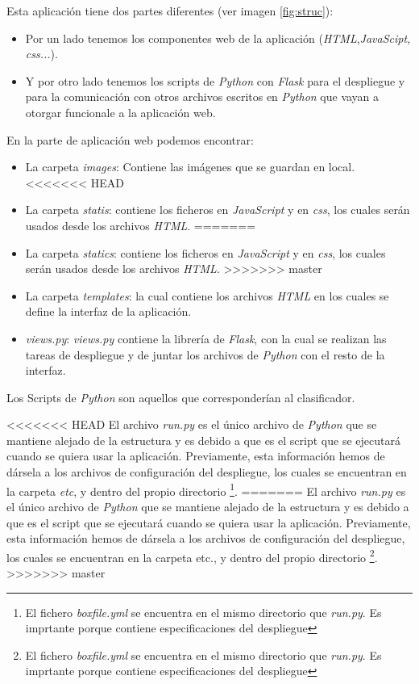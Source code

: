 Esta aplicación tiene dos partes diferentes (ver imagen \ref{fig:struc}):

\begin{itemize}
	\item Por un lado tenemos los componentes web de la aplicación (\textit{HTML},\textit{JavaScipt, css...}).
	\item Y por otro lado tenemos los scripts de \textit{Python} con \textit{Flask} para el despliegue y para la comunicación con otros archivos escritos en \textit{Python} que vayan a otorgar funcionale a la aplicación web.
\end{itemize}

En la parte de aplicación web podemos encontrar:
\begin{itemize}
	\item La carpeta \textit{images}: Contiene las imágenes que se guardan en local.
<<<<<<< HEAD
	\item La carpeta \textit{statis}: contiene los ficheros en \textit{JavaScript} y en \textit{css}, los cuales serán usados desde los archivos \textit{HTML}.
=======
	\item La carpeta \textit{statics}: contiene los ficheros en \textit{JavaScript} y en \textit{css}, los cuales serán usados desde los archivos \textit{HTML}.
>>>>>>> master
	\item La carpeta \textit{templates}: la cual contiene los archivos \textit{HTML} en los cuales se define la interfaz de la aplicación.
	\item \textit{views.py}: \textit{views.py} contiene la librería de \textit{Flask}, con la cual se realizan las tareas de despliegue y de juntar los archivos de \textit{Python} con el resto de la interfaz.
\end{itemize}
 
 Los Scripts de \textit{Python} son aquellos que corresponderían al clasificador.
 
<<<<<<< HEAD
 El archivo \textit{run.py} es el único archivo de \textit{Python} que se mantiene alejado de la estructura y es debido a que es el script que se ejecutará cuando se quiera usar la aplicación. Previamente, esta información hemos de dársela a los archivos de configuración del despliegue, los cuales se encuentran en la carpeta \textit{etc}, y dentro del propio directorio \footnote{El fichero \textit{boxfile.yml} se encuentra en el mismo directorio que \textit{run.py}. Es imprtante porque contiene especificaciones del despliegue}.
=======
 El archivo \textit{run.py} es el único archivo de \textit{Python} que se mantiene alejado de la estructura y es debido a que es el script que se ejecutará cuando se quiera usar la aplicación. Previamente, esta información hemos de dársela a los archivos de configuración del despliegue, los cuales se encuentran en la carpeta etc., y dentro del propio directorio \footnote{El fichero \textit{boxfile.yml} se encuentra en el mismo directorio que \textit{run.py}. Es imprtante porque contiene especificaciones del despliegue}.
>>>>>>> master
 
